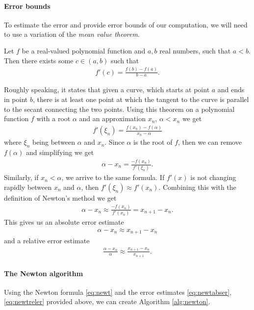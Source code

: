 \documentclass[
  digital, %
  notable,   %
  nolof,     %
  nolot,     %
	final, %
]{fithesis3}
\begin{document}
\paragraph{Error bounds}
To estimate the error and provide error bounds of our computation, we will need to use a variation of the \emph{mean value theorem}.
\begin{theorem}
Let $f$ be a real-valued polynomial function and $a, b$ real numbers, such that $a < b$. Then there exists some $c\in(a, b)$ such that
\begin{align}
f'(c) = \frac{f(b) - f(a)}{b - a}.
\end{align}
\end{theorem}%
Roughly speaking, it states that given a curve, which starts at point $a$ and ends in point $b$, there is at least one point at which the tangent to the curve is parallel to the secant connecting the two points.
Using this theorem on a polynomial function $f$ with a root $\alpha$ and an approximation $x_{n}$, $\alpha < x_{n}$ we get 
\begin{align}
f'(\xi_n) = \frac{f(x_{n})-f(\alpha)}{x_{n}-\alpha}
\end{align}
where $\xi_{n}$ being between $\alpha$ and $x_{n}$. Since $\alpha$ is the root of $f$, then we can remove $f(\alpha)$ and simplifying we get
\begin{align}
\alpha - x_{n} = \frac{-f(x_{n})}{f'(\xi_n)}.
\end{align}
Similarly, if $x_{n} < \alpha$, we arrive to the same formula. If $f'(x)$ is not changing rapidly between $x_{n}$ and $\alpha$, then $f'(\xi_{n}) \approx f'(x_{n})$. Combining this with the definition of Newton's method we get
\begin{align}
\alpha - x_{n} \approx \frac{-f(x_{n})}{f'(x_{n})} = x_{n+1} - x_{n}.
\end{align}
This gives us an absolute error estimate
\begin{align}
\alpha - x_{n} \approx x_{n+1} - x_{n} \label{eq:newtabser}
\end{align}
and a relative error estimate
\begin{align}
\frac{\alpha - x_{n}}{\alpha} \approx \frac{x_{n+1} - x_{n}}{x_{n+1}}.\label{eq:newtreler}
\end{align}
\paragraph{The Newton algorithm}
Using the Newton formula \eqref{eq:newt} and the error estimates \eqref{eq:newtabser}, \eqref{eq:newtreler} provided above, we can create  Algorithm \ref{alg:newton}.
\end{document}
